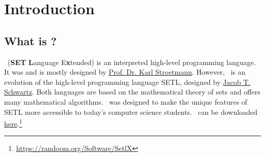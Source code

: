 
\chapter{Introduction}

\section*{What is \setlx?}

	\setlx\ (\textbf{SET} \textbf{L}anguage E\textbf{x}tended) is an interpreted high-level programming language. It was and is mostly designed by \href{https://github.com/karlstroetmann}{Prof. Dr. Karl Stroetmann}. However, \setlx\ is an evolution of the high-level programming language SETL, designed by \href{https://en.wikipedia.org/wiki/Jacob_T._Schwartz}{Jacob T. Schwartz}. Both languages are based on the mathematical theory of sets and offers many mathematical algorithms. \setlx\ was designed to make the unique features of SETL more accessible to today's computer science students. \setlx\ can be downloaded \href{https://randoom.org/Software/SetlX}{here}.\footnote{\url{https://randoom.org/Software/SetlX}}